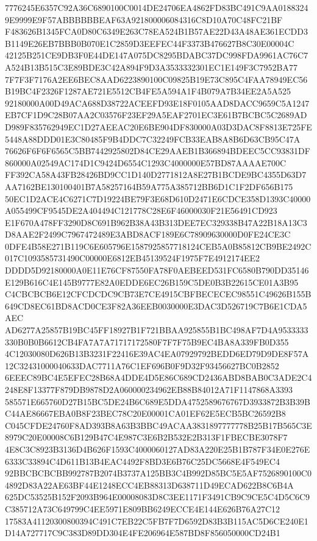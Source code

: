 \documentclass[UTF8,fontset=fandol,zihao=-4,a4paper]{ctexart}
\begin{document}
{{7776245E6357C92A36C6890100C0014DE24706EA4862FD83BC491C9AA01883249E9999E9F57ABBBBBBEAF63A921800006084316C8D10A70C48FC21BF
F483626B1345FCA0D80C6349E263C78EA524B1B57AE22D43A48AE361ECDD3B1149E26EB7BBB0B070E1C2859D3EEFEC44F3373B476627B8C30E00004C
42125B251CE9DB3F0E44DE147A075DC8295BDABC37DC998FDA9961AC76C7A524B13B515C3E89BDE3C42A894F9D3A3533332301EC1E149F3C7952BA77
7F7F3F7176A2EE6BEC8AAD6223890100C09825B19E73C895C4FAA78949EC56B19BC4F2326F1287AE721E5512CB4FE5A594A1F4B079A7B34EE2A5A525
92180000A00D49ACA688D38722ACEEFD93E18F0105AAD8DACC9659C5A1247EB7CF1D9C28B07AA2C03576F23EF29A5EAF2701EC3E61B7BCBC5C2689AD
D989F835762949EC1D27AEEAC20E6BE904DF830000A03D3DAC8F8813E725FE5448A88DDD01E3C80485F9B4DDC7C32249FCB33EAB8A8B6D63CB95C47A
76626F6F6F6565C5BB7442925802D84CE29AAEB1B366894BDEEC5CC93831DF860000A02549AC174D1C9424D6554C1293C4000000E57BD87AAAAE700C
FF392CA58A43FB28426BD9CC1D140D2771812A8E27B1BCDE9BC4355D63D7AA7162BE130100401B7A58257164B59A775A385712BB6D1C1F2DF656B175
50EC1D2ACE4C6271C7D19224BE79F3E68D610D2471E6CDCE358D1393C40000A055499CF9545DE2A404494C121778C28E6F46000030F21E56491CD923
E1F670A478FF3290D8C691B962B38A43B313DEE7EC329338B47A22B18A13C3D8AAE2F2499C7967472489E3ABD8ACF189E6C78909630000D0FE24CE3C
0DFE4B58E271B119C6E605796E1587925857718124CEB5A0B85812CB9BE2492C017C1093585731490C00000E6812EB45139524F1975F7E4912174EE2
DDDD5D92180000A0E11E76CF87550FA78F0AEBEED531FC6580B790DD35146E129B616C4E145B9777E82A0EDDE6EC26B159C5DE0B3B22615CE01A3B95
C4CBCBCB6E12CFCDCDC9CB73E7CE4915CBFBECECEC98551C49626B155B649CD8EC61BD8ACD0CE3F82A36EEB0030000E3DAC3D526719C7B6E1CDA5AEC
AD6277A25857B19BC45FF18927B1F721BBAA925855B1BC498AF7D4A9533333330B0B0B6612CB4FA7A7A71717172580F7F7F75B9EC4BA8A339FB0D355
4C12030080D626B13B3231F22416E39AC4EA07929792BEDD6ED79D9DE8F57A12C32431000040633DAC7711A76C1EF696B0F9D32F93456627BC0B2852
6EEEC89BC4E5EFEC28B68A4DDE4D5E86C689CD2436ABD8BAB0C3ADE2C4248E8F13377F879DB9878D2A060000234962EB88B84012A71F1147868A3393
585571E665760D27B15BC5DE24B6C689E5DDA4752589676767D3933872B3B39BC44AE86667EBA0B8F23BEC78C20E00001CA01EF62E5ECB5BC26592B8
C045CFDE24760F8AD393B8A63B3BBC49ACAA3831897777778B25B17B565C3E8979C20E00008C6B129B47C4E987C3E6B2B532E2B313F1FBECBE3078F7
4E8C3C8923B3136D4B626F1593C4000060127AD83A220E25B1B787F34E0E276E6333C33894C4D611B13B4EAC4492F8BD3E6B76C25DC5668E4F549EC4
92BBCBCBCBB992787B2074B3737A125BB3C4B992D85BC5E5AF7526890100C04892D83A22AE63BF44E1248ECC4EB88313D638711D49ECAD622B8C6B4A
625DC53525B152F2093B964E00008083D8C3EE1171F3491CB9C9CE5C4D5C6C9C385712A73C649799C4EE5971E809BB6249ECCE4E144E626B76A27C12
17583A41120300800394C491C7EB22C5FB7F7D6592D83B3B115AC5D6CE240E1D14A727717C9C383D89DD304E4FE206964E587BD8F856050000CD24B1
}}
\end{document}
